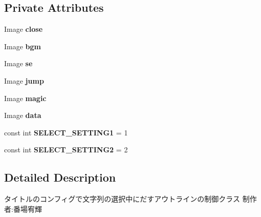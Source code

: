 \subsection*{Private Attributes}
\begin{DoxyCompactItemize}
\item 
\mbox{\label{class_title_config_string_outline_a5633fd8b77f321fd66c80dfeedbdb6af}} 
Image {\bfseries close}
\item 
\mbox{\label{class_title_config_string_outline_aee0eea20bd0a7f0a6182ff92de8598b7}} 
Image {\bfseries bgm}
\item 
\mbox{\label{class_title_config_string_outline_ac1962c78722e850bea95b7f1c19ed5ad}} 
Image {\bfseries se}
\item 
\mbox{\label{class_title_config_string_outline_a2cdd934a278cea3dc717a554b92358f9}} 
Image {\bfseries jump}
\item 
\mbox{\label{class_title_config_string_outline_a6c7f2a9ef3bf4fd5148bebdf2a609644}} 
Image {\bfseries magic}
\item 
\mbox{\label{class_title_config_string_outline_a6e243ce513db9e03069405734fda56a7}} 
Image {\bfseries data}
\item 
\mbox{\label{class_title_config_string_outline_ab5858a46b0432f1ab140f2c07f7187dc}} 
const int {\bfseries S\+E\+L\+E\+C\+T\+\_\+\+S\+E\+T\+T\+I\+N\+G1} = 1
\item 
\mbox{\label{class_title_config_string_outline_a6c7db6d354ac453a822cfa885d749c7e}} 
const int {\bfseries S\+E\+L\+E\+C\+T\+\_\+\+S\+E\+T\+T\+I\+N\+G2} = 2
\end{DoxyCompactItemize}


\subsection{Detailed Description}
タイトルのコンフィグで文字列の選択中にだすアウトラインの制御クラス 制作者\+:番場宥輝 



